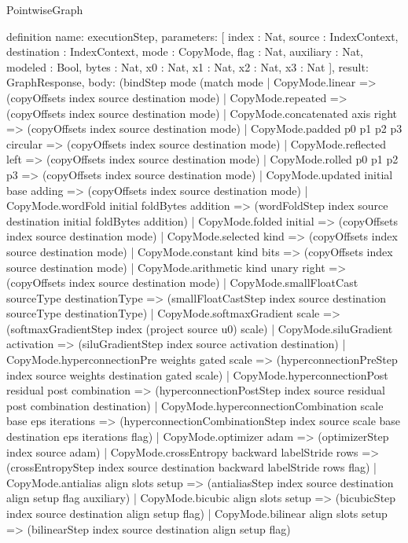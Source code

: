 \begin{lexlean}{PointwiseGraph}
\begin{semanticmodule}
definition{
  name: executionStep,
  parameters: [
    index : Nat,
    source : IndexContext,
    destination : IndexContext,
    mode : CopyMode,
    flag : Nat,
    auxiliary : Nat,
    modeled : Bool,
    bytes : Nat,
    x0 : Nat,
    x1 : Nat,
    x2 : Nat,
    x3 : Nat
  ],
  result: GraphResponse,
  body: (bindStep mode (match mode
    | CopyMode.linear => (copyOffsets index source destination mode)
    | CopyMode.repeated => (copyOffsets index source destination mode)
    | CopyMode.concatenated axis right => (copyOffsets index source destination mode)
    | CopyMode.padded p0 p1 p2 p3 circular => (copyOffsets index source destination mode)
    | CopyMode.reflected left => (copyOffsets index source destination mode)
    | CopyMode.rolled p0 p1 p2 p3 => (copyOffsets index source destination mode)
    | CopyMode.updated initial base adding => (copyOffsets index source destination mode)
    | CopyMode.wordFold initial foldBytes addition => (wordFoldStep index source destination initial foldBytes addition)
    | CopyMode.folded initial => (copyOffsets index source destination mode)
    | CopyMode.selected kind => (copyOffsets index source destination mode)
    | CopyMode.constant kind bits => (copyOffsets index source destination mode)
    | CopyMode.arithmetic kind unary right => (copyOffsets index source destination mode)
    | CopyMode.smallFloatCast sourceType destinationType => (smallFloatCastStep index source destination sourceType destinationType)
    | CopyMode.softmaxGradient scale => (softmaxGradientStep index (project source u0) scale)
    | CopyMode.siluGradient activation => (siluGradientStep index source activation destination)
    | CopyMode.hyperconnectionPre weights gated scale => (hyperconnectionPreStep index source weights destination gated scale)
    | CopyMode.hyperconnectionPost residual post combination => (hyperconnectionPostStep index source residual post combination destination)
    | CopyMode.hyperconnectionCombination scale base eps iterations => (hyperconnectionCombinationStep index source scale base destination eps iterations flag)
    | CopyMode.optimizer adam => (optimizerStep index source adam)
    | CopyMode.crossEntropy backward labelStride rows => (crossEntropyStep index source destination backward labelStride rows flag)
    | CopyMode.antialias align slots setup => (antialiasStep index source destination align setup flag auxiliary)
    | CopyMode.bicubic align slots setup => (bicubicStep index source destination align setup flag)
    | CopyMode.bilinear align slots setup => (bilinearStep index source destination align setup flag)
}
\end{semanticmodule}
\end{lexlean}
